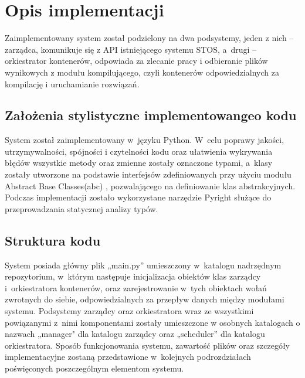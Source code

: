 \section{Opis implementacji}
Zaimplementowany system został podzielony na dwa podsystemy, jeden z nich -- zarządca, komunikuje się z API istniejącego systemu STOS, a~drugi -- orkiestrator kontenerów, odpowiada za zlecanie pracy i odbieranie plików wynikowych z modułu kompilującego, czyli kontenerów odpowiedzialnych za kompilację i uruchamianie rozwiązań.

\subsection{Założenia stylistyczne implementowangeo kodu}
System został zaimplementowany w~języku Python. W~celu poprawy jakości, utrzymywalności, spójności i czytelności kodu oraz ułatwienia wykrywania błędów wszystkie metody oraz zmienne zostały oznaczone typami, a~klasy zostały utworzone na podstawie interfejsów zdefiniowanych przy użyciu modułu Abstract Base Classes(abc) \cite{pythonAbc}, pozwalającego na definiowanie klas abstrakcyjnych. Podczas implementacji zostało wykorzystane narzędzie Pyright służące do przeprowadzania statycznej analizy typów.

\subsection{Struktura kodu}
System posiada główny plik „main.py” umieszczony w~katalogu nadrzędnym repozytorium, w~którym następuje inicjalizacja obiektów klas zarządcy i~orkiestratora kontenerów, oraz zarejestrowanie w~tych obiektach wołań zwrotnych do siebie, odpowiedzialnych za przepływ danych między modułami systemu. Podsystemy zarządcy oraz orkiestratora wraz ze wszystkimi powiązanymi z~nimi komponentami zostały umieszczone w osobnych katalogach o nazwach „manager" dla katalogu zarządcy oraz „scheduler” dla katalogu orkiestratora.
Sposób funkcjonowania systemu, zawartość plików oraz szczegóły implementacyjne zostaną przedstawione w~kolejnych podrozdziałach poświęconych poszczególnym elementom systemu. 
